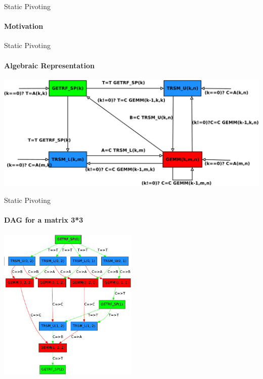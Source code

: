\begin{frame}{Static Pivoting}
\framesubtitle{Motivation}
\end{frame}

\begin{frame}{Static Pivoting}
\framesubtitle{Algebraic Representation}
\begin{center}
\includegraphics[scale=0.2]{dag_getrf_sp.pdf} 
\end{center}
\end{frame}

\begin{frame}{Static Pivoting}
\framesubtitle{DAG for a matrix 3*3}
\begin{center}
\includegraphics[width=0.5\textwidth]{dag33.png} 
\end{center}
\end{frame}
